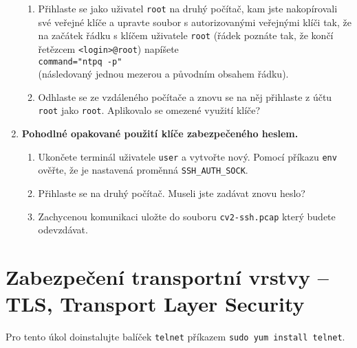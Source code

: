 \documentclass[a4paper,11pt]{article}
\begin{document}
\begin{enumerate}
    \begin{enumerate}

      \item Přihlaste se jako uživatel {\tt root} na druhý počítač, kam jste nakopírovali své veřejné klíče a upravte soubor s autorizovanými veřejnými klíči tak, že na začátek řádku s klíčem uživatele {\tt root} (řádek poznáte tak, že končí řetězcem
        {\tt <login>@root}) napíšete \\
        \verb|command="ntpq -p" | \\
        (následovaný jednou mezerou a původním obsahem řádku).

      \item Odhlaste se ze vzdáleného počítače a znovu se na něj přihlaste z účtu {\tt root} jako {\tt root}.
        Aplikovalo se omezené využití klíče?

    \end{enumerate}


  \item {\bf Pohodlné opakované použití klíče zabezpečeného heslem.}

    \begin{enumerate}

      \item Ukončete terminál uživatele {\tt user} a vytvořte nový.
        Pomocí příkazu \verb|env| ověřte, že je nastavená proměnná \verb|SSH_AUTH_SOCK|.

      \item Přihlaste se na druhý počítač.
        Museli jste zadávat znovu heslo?

      \item Zachycenou komunikaci uložte do souboru {\tt cv2-ssh.pcap} který budete odevzdávat.

    \end{enumerate}

\end{enumerate}

\section{Zabezpečení transportní vrstvy -- TLS, Transport Layer Security}

Pro tento úkol doinstalujte balíček {\tt telnet} příkazem {\tt sudo yum install telnet}.
\end{document}
